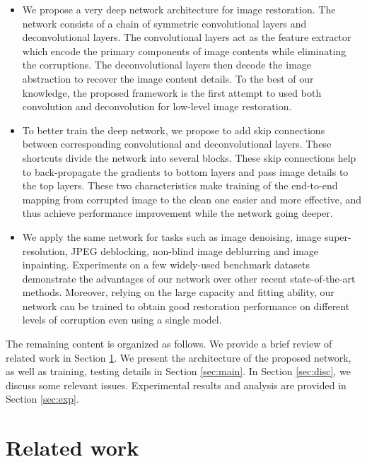 \documentclass[10pt,journal,compsoc]{IEEEtran}
\begin{document}
\begin{itemize}
  
\item We propose a very deep network architecture for image restoration. The network consists of a
chain of symmetric convolutional layers and deconvolutional layers. The convolutional layers act as
the feature extractor which encode the primary components of image contents while eliminating the
corruptions. The deconvolutional layers then decode the image abstraction to recover the image content
details. To the best of our knowledge, the proposed framework is the first attempt to used both
convolution and deconvolution for low-level image restoration.

\item To better train the deep network, we propose to add skip connections between corresponding
convolutional and deconvolutional layers. These shortcuts divide the network into several blocks.
These skip connections help to back-propagate the gradients to bottom layers and pass image details
to the top layers. These two characteristics make training of the end-to-end mapping from corrupted image
to the clean one easier and more effective, and thus achieve performance improvement while the network going deeper.

\item We apply the same network for tasks such as image denoising, image super-resolution, JPEG
    deblocking, non-blind image deblurring and image inpainting.
Experiments on a few widely-used  benchmark datasets demonstrate the advantages of our network over
other recent state-of-the-art methods. Moreover, relying on the large capacity and fitting
ability, our network can be trained to obtain good restoration performance on different levels
of corruption even using a single model.
\end{itemize}



The remaining content
is organized as follows. We provide a brief review of related work in Section \ref{sec:related}.
We present the architecture of the proposed network, as well as training, testing details in Section \ref{sec:main}.
In Section \ref{sec:disc}, we discuss some relevant issues.
Experimental results and analysis are provided in Section \ref{sec:exp}.
 




\section{Related work}
\label{sec:related}
\end{document}
